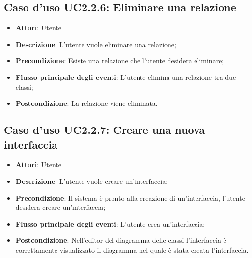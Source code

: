 \documentclass[../AnalisiDeiRequisiti.tex]{subfiles}
\begin{document}
			\subsection{Caso d'uso UC2.2.6: Eliminare una relazione}
			\begin{itemize}
				\item \textbf{Attori}: Utente
				\item \textbf{Descrizione}: L'utente vuole eliminare una relazione;
				\item \textbf{Precondizione}: Esiste una relazione che l'utente desidera eliminare;
				\item \textbf{Flusso principale degli eventi}: L'utente elimina una relazione tra due classi;
				\item \textbf{Postcondizione}: La relazione viene eliminata.
			\end{itemize}
			\subsection{Caso d'uso UC2.2.7: Creare una nuova interfaccia}
			\begin{itemize}
				\item \textbf{Attori}: Utente
				\item \textbf{Descrizione}: L'utente vuole creare un'interfaccia;
				\item \textbf{Precondizione}: Il sistema è pronto alla creazione di un'interfaccia, l'utente desidera creare un'interfaccia;
				\item \textbf{Flusso principale degli eventi}: L'utente crea un'interfaccia;
				\item \textbf{Postcondizione}: Nell'editor del diagramma delle classi l'interfaccia è correttamente visualizzato il diagramma nel quale è stata creata l'interfaccia.
			\end{itemize}
\end{document}

